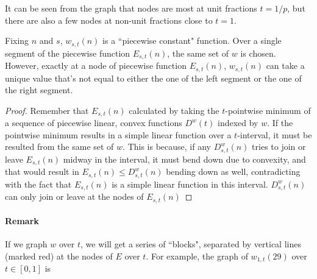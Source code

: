 \documentclass[]{article}
\begin{document}
It can be seen from the graph that nodes are most at unit fractions $t = 1/p$, but there are also a few nodes at non-unit fractions close to $t=1$.
\vspace{1cm}
\begin{lemma}[$s,t$-range]
	Fixing $n$ and $s$, $w_{s,t}(n)$ is a ``piecewise constant" function. Over a single segment of the piecewise function $E_{s,t}(n)$, the same set of $w$ is chosen. However, exactly at a node of piecewise function $E_{s,t}(n)$, $w_{s,t}(n)$ can take a unique value that's not equal to either the one of the left segment or the one of the right segment.
\end{lemma}
\begin{proof}
	Remember that $E_{s,t}(n)$ calculated by taking the $t$-pointwise minimum of a sequence of piecewise linear, convex functions $D^w(t)$ indexed by $w$. If the pointwise minimum results in a simple linear function over a $t$-interval, it must be resulted from the same set of $w$. This is because, if any $D^w_{s,t}(n)$ tries to join or leave $E_{s,t}(n)$ midway in the interval, it must bend down due to convexity, and that would result in  $E_{s,t}(n) \le D^w_{s,t}(n)$ bending down as well, contradicting with the fact that $E_{s,t}(n)$ is a simple linear function in this interval. $D^w_{s,t}(n)$ can only join or leave at the nodes of $E_{s,t}(n)$
\end{proof}

\paragraph{Remark}

If we graph $w$ over $t$, we will get a series of ``blocks", separated by vertical lines (marked red) at the nodes of $E$ over $t$. For example, the graph of $w_{1,t}(29)$ over $t\in[0,1]$ is 
\end{document}
